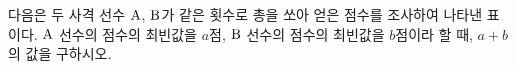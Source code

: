 다음은 두 사격 선수 $\mathrm{A}$, $\mathrm{B}$가 같은 횟수로 총을 쏘아 얻은 점수를 조사하여 나타낸 표이다. $\mathrm{A}$ 선수의 점수의 최빈값을 $a$점, $\mathrm{B}$ 선수의 점수의 최빈값을 $b$점이라 할 때, $a+b$의 값을 구하시오.
\par\smallskip\begin{center}\resizebox{\ifdim\width>\linewidth\linewidth\else\width\fi}{!}{}\end{center}
